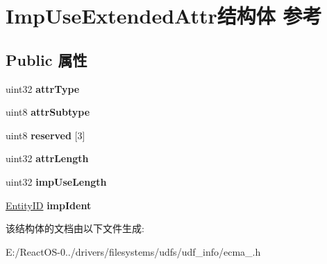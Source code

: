 \hypertarget{struct_imp_use_extended_attr}{}\section{Imp\+Use\+Extended\+Attr结构体 参考}
\label{struct_imp_use_extended_attr}
\subsection*{Public 属性}
\begin{DoxyCompactItemize}
\item 
\mbox{\label{struct_imp_use_extended_attr_afb2db739255e97224bd3ec93a63077fc}} 
uint32 {\bfseries attr\+Type}
\item 
\mbox{\label{struct_imp_use_extended_attr_a4fbe3b46b6a83aeb73d5061f21ec471f}} 
uint8 {\bfseries attr\+Subtype}
\item 
\mbox{\label{struct_imp_use_extended_attr_adf8c7349352c0c6386d7d3e1795598a9}} 
uint8 {\bfseries reserved} \mbox{[}3\mbox{]}
\item 
\mbox{\label{struct_imp_use_extended_attr_a61c8eed49c0f7988de04b485d78a8d0a}} 
uint32 {\bfseries attr\+Length}
\item 
\mbox{\label{struct_imp_use_extended_attr_a88b97ec07e3338a33aa62bcad8791674}} 
uint32 {\bfseries imp\+Use\+Length}
\item 
\mbox{\label{struct_imp_use_extended_attr_a9408cbf316977eb5f9f4cdc43a9fe8d1}} 
\hyperlink{struct_entity_i_d}{Entity\+ID} {\bfseries imp\+Ident}
\end{DoxyCompactItemize}


该结构体的文档由以下文件生成\+:\begin{DoxyCompactItemize}
\item 
E\+:/\+React\+O\+S-\/0../drivers/filesystems/udfs/udf\+\_\+info/ecma\+\_.\+h\end{DoxyCompactItemize}
